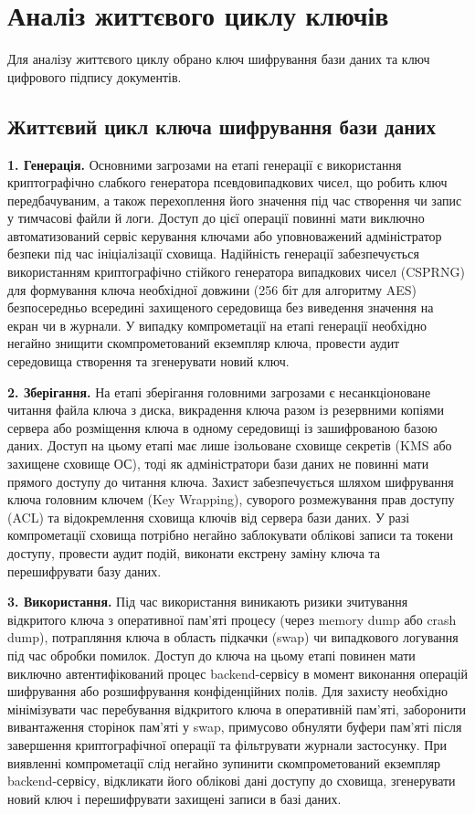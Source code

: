 \section{Аналіз життєвого циклу ключів}

Для аналізу життєвого циклу обрано ключ шифрування бази даних та ключ цифрового підпису документів.

\subsection{Життєвий цикл ключа шифрування бази даних}

\textbf{1. Генерація.}
Основними загрозами на етапі генерації є використання криптографічно слабкого генератора
псевдовипадкових чисел, що робить ключ передбачуваним, а також перехоплення його значення під час
створення чи запис у тимчасові файли й логи. Доступ до цієї операції повинні мати виключно
автоматизований сервіс керування ключами або уповноважений адміністратор безпеки під час ініціалізації
сховища. Надійність генерації забезпечується використанням криптографічно стійкого
генератора випадкових чисел (CSPRNG) для формування ключа необхідної довжини (256 біт для алгоритму
AES) безпосередньо всередині захищеного середовища без виведення значення на екран чи в журнали. У
випадку компрометації на етапі генерації необхідно негайно знищити скомпрометований екземпляр ключа,
провести аудит середовища створення та згенерувати новий ключ.

\textbf{2. Зберігання.}
На етапі зберігання головними загрозами є несанкціоноване читання файла ключа з диска, викрадення ключа
разом із резервними копіями сервера або розміщення ключа в одному середовищі із зашифрованою базою
даних. Доступ на цьому етапі має лише ізольоване сховище секретів (KMS або захищене сховище ОС), тоді як
адміністратори бази даних не повинні мати прямого доступу до читання ключа. Захист забезпечується
шляхом шифрування ключа головним ключем (Key Wrapping), суворого розмежування прав доступу (ACL) та
відокремлення сховища ключів від сервера бази даних. У разі компрометації сховища потрібно негайно
заблокувати облікові записи та токени доступу, провести аудит подій, виконати екстрену заміну ключа та
перешифрувати базу даних.

\textbf{3. Використання.}
Під час використання виникають ризики зчитування відкритого ключа з оперативної пам'яті процесу (через
memory dump або crash dump), потрапляння ключа в область підкачки (swap) чи випадкового логування під
час обробки помилок. Доступ до ключа на цьому етапі повинен мати виключно автентифікований процес
backend-сервісу в момент виконання операцій шифрування або розшифрування конфіденційних полів. Для
захисту необхідно мінімізувати час перебування відкритого ключа в оперативній пам'яті, заборонити
вивантаження сторінок пам'яті у swap, примусово обнуляти буфери пам'яті після завершення криптографічної
операції та фільтрувати журнали застосунку. При виявленні компрометації слід негайно зупинити
скомпрометований екземпляр backend-сервісу, відкликати його облікові дані доступу до сховища,
згенерувати новий ключ і перешифрувати захищені записи в базі даних.

